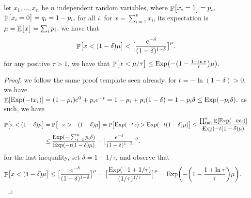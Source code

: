 \begin{theorem}
    let $x_1, \ldots, x_n$ be $n$ independent random variables, where
    \begin{math}
        \Prob{ \bigl. x_i = 1 } =p_i,
    \end{math}
    \begin{math}
        \Prob{ \bigl. x_i = 0 } =q_i = 1-p_i, 
    \end{math}
    for all $i$.  for $x = \sum_{i=1}^{n} x_i$, its expectation is
    $\mu = \mathop{\mathbb{E}}\!\left[ {\bigl. x} \right] = \sum_i p_i$.  we have that
    \begin{equation*}
        \Prob{\bigl. x < (1-\delta)\mu } <
        \bigl[  \frac{e^{-\delta}}{(1-\delta)^{1-\delta}} \bigr]^\mu .
    \end{equation*}
    for any positive $\tau > 1$, we have that
    \begin{math}
      \Prob{ x < \mu/\tau \bigr.} %
      \leq%
      \Exp\pth{-\pth{1 - \frac{1 + \ln \tau}{\tau}} \mu}.
  \end{math}
\end{theorem}


\begin{proof}
    we follow the same proof template seen already. for
    $t = - \ln( 1-\delta ) > 0$, we have
    \begin{math}
        \Ex{\Exp( -t x_i)}%
        =%
        (1-p_i) e^0 + p_i e^{-t}%
        =%
        1-p_i + p_i ( 1-\delta)%
        =%
        1 - p_i\delta%
        \leq%
        \Exp \pth{ -p_i \delta}.
    \end{math}
    as such, we have
    \begin{align*}
      \Prob{ x < (1-\delta)\mu \bigr.} %
      &=%
        \Prob{ -x > -(1-\delta)\mu \bigr.} %
        = %
        \Prob{ \Exp( -t x)  > \Exp\pth{-t(1-\delta)\mu} \bigr.}
        \leq %
        \frac{\prod_{i=1}^n \Ex{\Exp( -t x_i)}}{\Exp\pth{-t(1-\delta)\mu}}\\
      &
        \leq%
        \frac{\Exp\pth{-\sum_{i=1}^n  p_i\delta}}
        {\Exp\pth{-t(1-\delta)\mu}}  %
        =%
            \bigl[  \frac{e^{-\delta}}{(1-\delta)^{1-\delta}} \bigr]^\mu.
    \end{align*}
    for the last inequality, set $\delta = 1-1/\tau$, and observe that 
    \begin{align*}
      \Prob{ x < (1-\delta)\mu \bigr.} %
      &
        \leq%
        \bigl[  \frac{e^{-\delta}}{(1-\delta)^{1-\delta}} \bigr]^\mu
        =%
        \bigl[  \frac{\Exp\pth{-1 + 1/\tau}}
        {(1/\tau)^{1/\tau}} \bigr]^\mu
        =%
        \Exp\pth{-\pth{1 - \frac{1 + \ln \tau}{\tau}} \mu}.
    \end{align*}
\end{proof}



